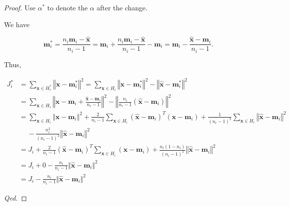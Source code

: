 \documentclass{article}
\begin{document}
\vspace{1em}
\begin{proof}
Use $\alpha^*$ to denote the $\alpha$ after the change.

\hspace{1.3em}
We have

\vspace{-2em}
$$\mathbf{m}_i^* = \frac{n_i\mathbf{m}_i - \hat{\mathbf{x}}}{n_i-1} = \mathbf{m}_i + \frac{n_i\mathbf{m}_i - \hat{\mathbf{x}}}{n_i-1} -\mathbf{m}_i = \mathbf{m}_i - \frac{\hat{\mathbf{x}}-\mathbf{m}_i}{n_i-1}.$$

\vspace{-1em} \hspace{1.3em}
Thus,

\vspace{-3em}
\begin{align*}
    J_i^* &= \sum_{\mathbf{x}\in H_i^*}\left\Vert\mathbf{x}-\mathbf{m}_i^*\right\Vert^2 = \sum_{\mathbf{x}\in H_i}\left\Vert\mathbf{x}-\mathbf{m}_i^*\right\Vert^2 - \left\Vert\hat{\mathbf{x}}-\mathbf{m}_i^*\right\Vert^2 \\
    &= \sum_{\mathbf{x}\in H_i}\left\Vert\mathbf{x}-\mathbf{m}_i+ \frac{\hat{\mathbf{x}}-\mathbf{m}_i}{n_i-1}\right\Vert^2 - \left\Vert\frac{n_i}{n_i-1}(\hat{\mathbf{x}}-\mathbf{m}_i)\right\Vert^2 \\
    & = \sum_{\mathbf{x}\in H_i}\left\Vert\mathbf{x}-\mathbf{m}_i\right\Vert^2 + \frac{2}{n_i-1}\sum_{\mathbf{x}\in H_i}\left(\hat{\mathbf{x}}-\mathbf{m}_i\right)^T\left(\mathbf{x}-\mathbf{m}_i\right) + \frac{1}{(n_i-1)^2}\sum_{\mathbf{x}\in H_i}\left\Vert\hat{\mathbf{x}}-\mathbf{m}_i\right\Vert^2\quad\ \\
    &\quad\  - \frac{n_i^2}{(n_i-1)^2}\left\Vert\hat{\mathbf{x}}-\mathbf{m}_i\right\Vert^2 \\
    & = J_i + \frac{2}{n_i-1}(\hat{\mathbf{x}}-\mathbf{m}_i)^T\sum_{\mathbf{x}\in H_i}(\mathbf{x}-\mathbf{m}_i)+\frac{n_i(1-n_i)}{(n_i-1)^2}\left\Vert\hat{\mathbf{x}}-\mathbf{m}_i\right\Vert^2 \\
    & = J_i + 0 - \frac{n_i}{n_i-1}\Vert\hat{\mathbf{x}}-\mathbf{m}_i\Vert^2 \\
    &= J_i - \frac{n_i}{n_i-1}\Vert\hat{\mathbf{x}}-\mathbf{m}_i\Vert^2
\end{align*}

\hspace{38em}
\textit{Qed.}
\end{proof}
\end{document}
